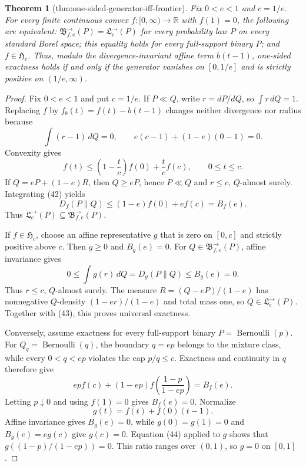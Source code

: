 \documentclass{article}
\newtheorem{theorem}{Theorem}
\begin{document}
\begin{theorem}[thm:one-sided-generator-iff-frontier]\label{thm:one-sided-generator-iff-frontier}
Fix \(0<e<1\) and \(c=1/e\). For every finite continuous convex \(f:[0,\infty)\to\mathbb R\) with \(f(1)=0\), the following are equivalent: \(\mathfrak B^{\to}_{f,e}(P)=\mathfrak L^{\to}_e(P)\) for every probability law \(P\) on every standard Borel space; this equality holds for every full-support binary \(P\); and \(f\in\mathfrak H_c\). Thus, modulo the divergence-invariant affine term \(b(t-1)\), one-sided exactness holds if and only if the generator vanishes on \([0,1/e]\) and is strictly positive on \((1/e,\infty)\).
\end{theorem}
\begin{proof}
Fix \(0<e<1\) and put \(c=1/e\).  If \(P\ll Q\), write \(r=dP/dQ\), so \(\int r\,dQ=1\).  Replacing \(f\) by \(f_b(t)=f(t)-b(t-1)\) changes neither divergence nor radius because
\[
 \int(r-1)\,dQ=0,
 \qquad
 e(c-1)+(1-e)(0-1)=0. \tag{41}
\]
Convexity gives
\[
 f(t)\le\left(1-\frac tc\right)f(0)+\frac tc f(c),
 \qquad 0\le t\le c. \tag{42}
\]
If \(Q=eP+(1-e)R\), then \(Q\ge eP\), hence \(P\ll Q\) and \(r\le c\), \(Q\)-almost surely.  Integrating (42) yields
\[
 D_f(P\|Q)\le(1-e)f(0)+ef(c)=B_f(e). \tag{43}
\]
Thus \(\mathfrak L^{\to}_e(P)\subseteq\mathfrak B^{\to}_{f,e}(P)\).

If \(f\in\mathfrak H_c\), choose an affine representative \(g\) that is zero on \([0,c]\) and strictly positive above \(c\).  Then \(g\ge0\) and \(B_g(e)=0\).  For \(Q\in\mathfrak B^{\to}_{f,e}(P)\), affine invariance gives
\[
 0\le\int g(r)\,dQ=D_g(P\|Q)\le B_g(e)=0.
\]
Thus \(r\le c\), \(Q\)-almost surely.  The measure \(R=(Q-eP)/(1-e)\) has nonnegative \(Q\)-density \((1-er)/(1-e)\) and total mass one, so \(Q\in\mathfrak L^{\to}_e(P)\).  Together with (43), this proves universal exactness.

Conversely, assume exactness for every full-support binary \(P=\operatorname{Bernoulli}(p)\).  For \(Q_q=\operatorname{Bernoulli}(q)\), the boundary \(q=ep\) belongs to the mixture class, while every \(0<q<ep\) violates the cap \(p/q\le c\).  Exactness and continuity in \(q\) therefore give
\[
 epf(c)+(1-ep)f\!\left(\frac{1-p}{1-ep}\right)=B_f(e). \tag{44}
\]
Letting \(p\downarrow0\) and using \(f(1)=0\) gives \(B_f(e)=0\).  Normalize
\[
 g(t)=f(t)+f(0)(t-1).
\]
Affine invariance gives \(B_g(e)=0\), while \(g(0)=g(1)=0\) and \(B_g(e)=eg(c)\) give \(g(c)=0\).  Equation (44) applied to \(g\) shows that \(g((1-p)/(1-ep))=0\).  This ratio ranges over \((0,1)\), so \(g=0\) on \([0,1]\).


\end{proof}
\end{document}
